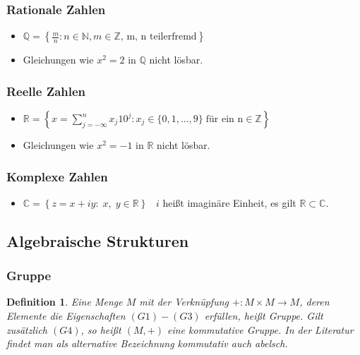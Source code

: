 \documentclass[12pt,a4paper]{article}%
\let\harvardleftorig\harvardleft
\newtheorem{definition}[satz]{Definition}
\numberwithin{equation}{section}
\newcommand{\R}{\mathbb{R}} %
\newcommand{\N}{\mathbb{N}}
\newcommand{\Z}{\mathbb{Z}}
\newcommand{\Q}{\mathbb{Q}}
\newcommand{\C}{\mathbb{C}}
\newcommand\citeVgl
{\def\harvardleft{(Vgl.\ \global\let\harvardleft\harvardleftorig}%
 \cite
}
\numberwithin{equation}{subsection}
\begin{document}
    \subsubsection{Rationale Zahlen}
		\begin{itemize} 
			\item $\Q = \left\lbrace \frac{m}{n}: n\in \N, m \in \Z\text{, m, n teilerfremd} \right\rbrace$
			\item Gleichungen wie $x^2 = 2$ in $\Q$ nicht lösbar.
		\end{itemize}

		\subsubsection{Reelle Zahlen}
		\begin{itemize}
			\item $\R = \left\lbrace x = \sum_{j = - \infty}^n x_j 10^j : x_j \in \{0, 1, ..., 9\}\; \text{für ein n} \in \Z \right\rbrace $
			\item Gleichungen wie $x^2 = -1$ in $\R$ nicht lösbar.
		\end{itemize}

		\subsubsection{Komplexe Zahlen}
		\begin{itemize}
			\item $\C = \left\lbrace z = x + iy:\; x,\;y \in \R \right\rbrace$
			\ $i$ heißt imaginäre Einheit, es gilt $\R \subset \C$.
		\end{itemize}
	
	\subsection{Algebraische Strukturen}
		\subsubsection{Gruppe}
		\begin{definition} 
		  \glqq Eine Menge $M$ mit der Verknüpfung $+:M\times M \rightarrow M$, deren Elemente die Eigenschaften $(G1) - (G3)$ erfüllen, heißt Gruppe. Gilt zusätzlich $(G4)$, so heißt $(M,+)$ eine kommutative Gruppe.\grqq \cite{HM12}
		In der Literatur findet man als alternative Bezeichnung kommutativ auch abelsch. \citeVgl{LinAF}
		\end{definition}
		
\end{document}
